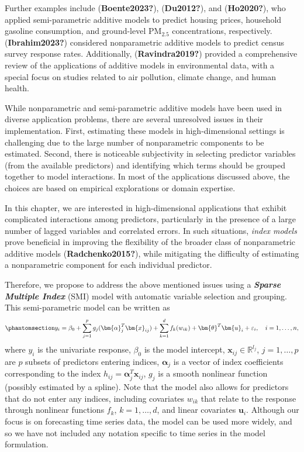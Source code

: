 \documentclass[
  11pt,
  a4paper,
]{report}
\begin{document}
Further examples include (\textbf{Boente2023?}), (\textbf{Du2012?}), and
(\textbf{Ho2020?}), who applied semi-parametric additive models to
predict housing prices, household gasoline consumption, and ground-level
\(\text{PM}_{2.5}\) concentrations, respectively.
(\textbf{Ibrahim2023?}) considered nonparametric additive models to
predict census survey response rates. Additionally,
(\textbf{Ravindra2019?}) provided a comprehensive review of the
applications of additive models in environmental data, with a special
focus on studies related to air pollution, climate change, and human
health.

While nonparametric and semi-parametric additive models have been used
in diverse application problems, there are several unresolved issues in
their implementation. First, estimating these models in high-dimensional
settings is challenging due to the large number of nonparametric
components to be estimated. Second, there is noticeable subjectivity in
selecting predictor variables (from the available predictors) and
identifying which terms should be grouped together to model
interactions. In most of the applications discussed above, the choices
are based on empirical explorations or domain expertise.

In this chapter, we are interested in high-dimensional applications that
exhibit complicated interactions among predictors, particularly in the
presence of a large number of lagged variables and correlated errors. In
such situations, \emph{index models} prove beneficial in improving the
flexibility of the broader class of nonparametric additive models
(\textbf{Radchenko2015?}), while mitigating the difficulty of estimating
a nonparametric component for each individual predictor.

Therefore, we propose to address the above mentioned issues using a
\textbf{\emph{Sparse Multiple Index}} (SMI) model with automatic
variable selection and grouping. This semi-parametric model can be
written as \begin{equation}\phantomsection\label{eq-semipara}{
  y_{i} = \beta_{0} + \sum_{j = 1}^{p}g_{j}(\bm{\alpha}_{j}^{T}\bm{x}_{ij}) + \sum_{k = 1}^{d}f_{k}(w_{ik}) + \bm{\theta}^{T}\bm{u}_{i} + \varepsilon_{i}, \quad i = 1, \dots, n,
}\end{equation} where \(y_{i}\) is the univariate response,
\(\beta_{0}\) is the model intercept,
\(\bm{x}_{ij} \in \mathbb{R}^{l_{j}}\), \(j = 1, \dots, p\) are \(p\)
subsets of predictors entering indices, \(\bm{\alpha}_{j}\) is a vector
of index coefficients corresponding to the index
\(h_{ij} = \bm{\alpha}_{j}^{T}\bm{x}_{ij}\), \(g_{j}\) is a smooth
nonlinear function (possibly estimated by a spline). Note that the model
also allows for predictors that do not enter any indices, including
covariates \(w_{ik}\) that relate to the response through nonlinear
functions \(f_{k}\), \(k = 1, \dots, d\), and linear covariates
\(\bm{u}_{i}\). Although our focus is on forecasting time series data,
the model can be used more widely, and so we have not included any
notation specific to time series in the model formulation.
\end{document}
